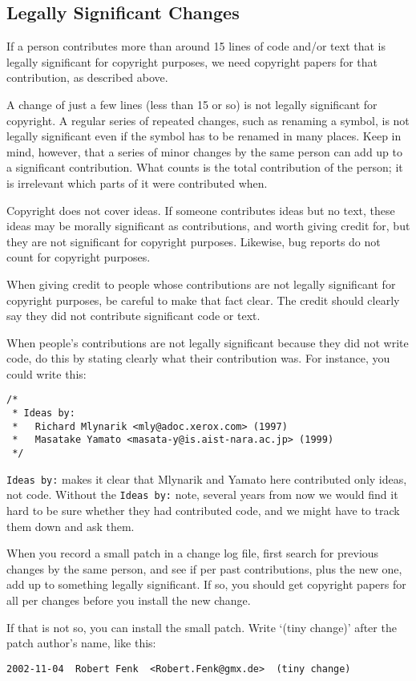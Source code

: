 \subsection{Legally Significant Changes}\label{section:significantChanges}

If a person contributes more than around 15 lines of code and/or text that is legally significant for copyright purposes, we need copyright papers for that contribution, as described above.
 
A change of just a few lines (less than 15 or so) is not legally significant for copyright. A regular series of repeated changes, such as renaming a symbol, is not legally significant even if the symbol has to be renamed in many places. Keep in mind, however, that a series of minor changes by the same person can add up to a significant contribution. What counts is the total contribution of the person; it is irrelevant which parts of it were contributed when.
 
Copyright does not cover ideas. If someone contributes ideas but no text, these ideas may be morally significant as contributions, and worth giving credit for, but they are not significant for copyright purposes. Likewise, bug reports do not count for copyright purposes.
 
When giving credit to people whose contributions are not legally significant for copyright purposes, be careful to make that fact clear. The credit should clearly say they did not contribute significant code or text.
 
When people’s contributions are not legally significant because they did not write code, do this by stating clearly what their contribution was. For instance, you could write this:
 
\begin{verbatim}
/*
 * Ideas by:
 *   Richard Mlynarik <mly@adoc.xerox.com> (1997)
 *   Masatake Yamato <masata-y@is.aist-nara.ac.jp> (1999)
 */
\end{verbatim}

{\tt Ideas by:} makes it clear that Mlynarik and Yamato here contributed only ideas, not code. 
Without the {\tt Ideas by:} note, several years from now we would find it hard to be sure whether they had contributed code, and we might have to track them down and ask them.
 
When you record a small patch in a change log file, first search for previous changes by the same person, and see if per past contributions, plus the new one, add up to something legally significant. If so, you should get copyright papers for all per changes before you install the new change.
 
If that is not so, you can install the small patch. Write ‘(tiny change)’ after the patch author’s name, like this:
 
\begin{verbatim}
2002-11-04  Robert Fenk  <Robert.Fenk@gmx.de>  (tiny change)
\end{verbatim}